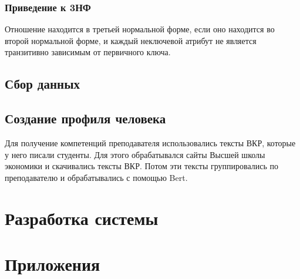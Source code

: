 \documentclass[PI,KR]{HSEUniversity}
\begin{document}
\subsection{Приведение к 3НФ}
Отношение находится в третьей нормальной форме, если оно находится во второй нормальной форме, и каждый неключевой атрибут не является транзитивно зависимым от первичного ключа.
\section{Сбор данных}

\section{Создание профиля человека}
Для получение компетенций преподавателя использовались тексты ВКР, которые у него писали студенты. Для этого обрабатывался сайты Высшей школы экономики и скачивались тексты ВКР. Потом эти тексты группировались по преподавателю и обрабатывались с помощью Bert. 
\chapter{Разработка системы}


\putbibliography %

\chapter*{Приложения}
\end{document}
